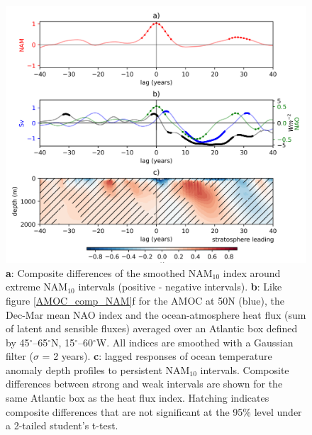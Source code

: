 \begin{figure}[h!]
\begin{center}
\noindent\includegraphics[width = 0.7\linewidth]{Figures/Figures-surface/Ocean_T_AMOC_NAO_responses_FINAL.png} 
\caption[Composite differences of NAO, heat flux and ocean temperature around extreme NAM$_{10}$ intervals.]{\textbf{a}: Composite differences of the smoothed NAM$_{10}$ index around extreme NAM$_{10}$ intervals (positive - negative intervals).
\textbf{b}: Like figure \ref{AMOC_comp_NAM}f for the AMOC at 50N (blue), the Dec-Mar mean NAO index and the ocean-atmosphere heat flux (sum of latent and sensible fluxes) averaged over an Atlantic box defined by 45$^{\circ}$–65$^{\circ}$N, 15$^{\circ}$–60$^{\circ}$W. All indices are smoothed with a Gaussian filter ($\sigma$ = 2 years). \textbf{c}: lagged responses of ocean temperature anomaly depth profiles to persistent NAM$_{10}$ intervals. Composite differences between strong and weak intervals are shown for the same Atlantic box as the heat flux index. Hatching indicates composite differences that are not significant at the 95\% level under a 2-tailed student's t-test.}
\label{NAO_AMOC_T_response}
\end{center}
\end{figure}

